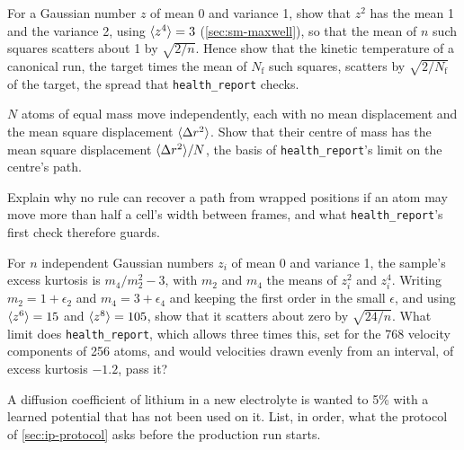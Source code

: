 \begin{exercise}
\label{ex:ip-chi}
For a Gaussian number $z$ of mean 0 and variance 1, show that $z^2$ has
the mean 1 and the variance 2, using $\langle z^4 \rangle = 3$ (\cref{sec:sm-maxwell}),
so that the mean of $n$ such squares scatters about 1 by $\sqrt{2/n}$.
Hence show that the kinetic temperature of a canonical run, the target
times the mean of $N_{\mathrm f}$ such squares, scatters by
$\sqrt{2/N_{\mathrm f}}$ of the target, the spread that
\texttt{health\_report} checks.
\end{exercise}

\begin{exercise}
\label{ex:ip-com}
$N$ atoms of equal mass move independently, each with no mean
displacement and the mean square displacement $\langle \Delta r^2 \rangle$. Show that their centre of mass has the
mean square displacement $\langle \Delta r^2 \rangle/N$, the basis of
\texttt{health\_report}'s limit on the centre's path.
\end{exercise}

\begin{exercise}
\label{ex:ip-unwrap}
Explain why no rule can recover a path from wrapped positions if an atom
may move more than half a cell's width between frames, and what
\texttt{health\_report}'s first check therefore guards.
\end{exercise}

\begin{exercise}
\label{ex:ip-kurtosis}
For $n$ independent Gaussian numbers $z_i$ of mean 0 and variance 1, the
sample's excess kurtosis is $m_4/m_2^2 - 3$, with $m_2$ and $m_4$ the
means of $z_i^2$ and $z_i^4$. Writing $m_2 = 1 + \epsilon_2$ and $m_4 = 3
+ \epsilon_4$ and keeping the first order in the small $\epsilon$, and
using $\langle z^6 \rangle = 15$ and $\langle z^8 \rangle = 105$, show that it scatters about
zero by $\sqrt{24/n}$. What limit does \texttt{health\_report}, which
allows three times this, set for the 768 velocity components of 256
atoms, and would velocities drawn evenly from an interval, of excess
kurtosis $-1.2$, pass it?
\end{exercise}

\begin{exercise}
\label{ex:ip-plan}
A diffusion coefficient of lithium in a new electrolyte is wanted to 5\%
with a learned potential that has not been used on it. List, in order,
what the protocol of \cref{sec:ip-protocol} asks before the production run
starts.
\end{exercise}

